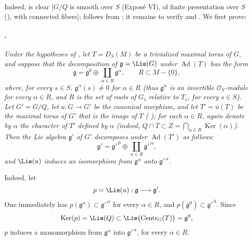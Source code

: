 Indeed, \textup{} is clear \textup{[\(G/Q\) is smooth over \(S\)
\textup{(Exposé VI)}, of finite presentation over \(S\)
\textup{()}, with connected fibers]};
\textup{} follows from ; it remains to verify
\textup{} and \textup{}. We first prove:

\paragraph{.}
\textit{Under the hypotheses of , let \(T=D_S(M)\) be a
trivialized maximal torus of \(G\), and suppose that the
decomposition of \(\mathfrak g=\Lie(G)\) under
\(\operatorname{Ad}(T)\) has the form}
\[
  \mathfrak g
  =
  \mathfrak g^0
  \oplus
  \coprod_{\alpha\in R}\mathfrak g^\alpha,
  \qquad
  R\subset M-\{0\},
\]
\textit{where, for every \(s\in S\),
\(\mathfrak g^\alpha(s)\ne0\) for \(\alpha\in R\)
\textup{(thus \(\mathfrak g^\alpha\) is an invertible
\(\mathcal O_S\)-module for every \(\alpha\in R\), and \(R\) is
the set of roots of \(G_{\bar s}\) relative to \(T_{\bar s}\), for
every \(s\in S\))}. Let \(G'=G/Q\), let \(u:G\to G'\) be the
canonical morphism, and let \(T'=u(T)\) be the maximal torus of \(G'\)
that is the image of \(T\) \textup{( \textup{})}; for each
\(\alpha\in R\), again denote by \(\alpha\) the character of \(T'\)
defined by \(\alpha\) \textup{(indeed,
\(Q\cap T\subset Z=\bigcap_{\alpha\in R}\operatorname{Ker}(\alpha)\))}.
Then the Lie algebra \(\mathfrak g'\) of \(G'\)
decomposes under \(\operatorname{Ad}(T')\) as follows:}
\[
  \mathfrak g'
  =
  \mathfrak g'^{\,0}
  \oplus
  \coprod_{\alpha\in R}\mathfrak g'^{\,\alpha},
\]
\textit{and \(\Lie(u)\) induces an isomorphism from
\(\mathfrak g^\alpha\) onto \(\mathfrak g'^{\,\alpha}\).}

Indeed, let
\[
  p=\Lie(u):\mathfrak g\longrightarrow\mathfrak g'.
\]
One immediately has
\(p(\mathfrak g^\alpha)\subset\mathfrak g'^{\,\alpha}\) for every
\(\alpha\in R\), and
\(p(\mathfrak g^0)\subset\mathfrak g'^{\,0}\). Since
\[
  \operatorname{Ker}(p)
  =
  \Lie(Q)
  \subset
  \Lie\bigl(\operatorname{Centr}_G(T)\bigr)
  =
  \mathfrak g^0,
\]
\(p\) induces a monomorphism from \(\mathfrak g^\alpha\) into
\(\mathfrak g'^{\,\alpha}\), for every \(\alpha\in R\).

